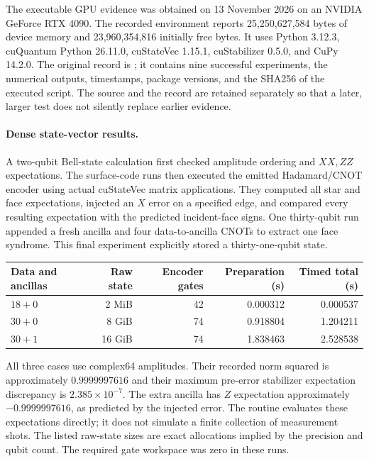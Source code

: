 The executable GPU evidence was obtained on 13 November 2026 on an
NVIDIA GeForce RTX 4090.  The recorded environment reports
25,250,627,584 bytes of device memory and 23,960,354,816 initially free
bytes.  It uses Python 3.12.3, cuQuantum Python 26.11.0, cuStateVec
1.15.1, cuStabilizer 0.5.0, and CuPy 14.2.0.  The original record is
; it contains nine
successful experiments, the numerical outputs, timestamps, package
versions, and the SHA256 of the executed script.  The source and the
record are retained separately so that a later, larger test does not
silently replace earlier evidence.

\paragraph{Dense state-vector results.}
A two-qubit Bell-state calculation first checked amplitude ordering and
$XX,ZZ$ expectations.  The surface-code runs then executed the emitted
Hadamard/CNOT encoder using actual cuStateVec matrix applications.  They
computed all star and face expectations, injected an $X$ error on a
specified edge, and compared every resulting expectation with the
predicted incident-face signs.  One thirty-qubit run appended a fresh
ancilla and four data-to-ancilla CNOTs to extract one face syndrome.
This final experiment explicitly stored a thirty-one-qubit state.

\begin{center}
\begin{tabular}{lrrrr}
\hline
Data and ancillas & Raw state & Encoder gates & Preparation (s) & Timed total (s)\\
\hline
$18+0$ & 2 MiB & 42 & 0.000312 & 0.000537\\
$30+0$ & 8 GiB & 74 & 0.918804 & 1.204211\\
$30+1$ & 16 GiB & 74 & 1.838463 & 2.528538\\
\hline
\end{tabular}
\end{center}

All three cases use complex64 amplitudes.  Their recorded norm squared
is approximately $0.9999997616$ and their maximum pre-error stabilizer
expectation discrepancy is $2.385\times10^{-7}$.  The extra ancilla has
$Z$ expectation approximately $-0.9999997616$, as predicted by the
injected error.  The routine evaluates these expectations directly; it
does not simulate a finite collection of measurement shots.  The listed
raw-state sizes are exact allocations implied by the precision and
qubit count.  The required gate workspace was zero in these runs.

